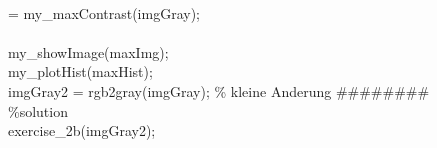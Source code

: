 {{    \\  [maxImg, maxHist] = my_maxContrast(imgGray);
    \\
    \\  my_showImage(maxImg);
    \\  my_plotHist(maxHist);
    \\  imgGray2 = rgb2gray(imgGray); {\color{red} \% kleine Anderung ######## }
    \\ \%solution
    \\  exercise_2b(imgGray2);
    \\ \ \\
    }
\pagebreak
    }

